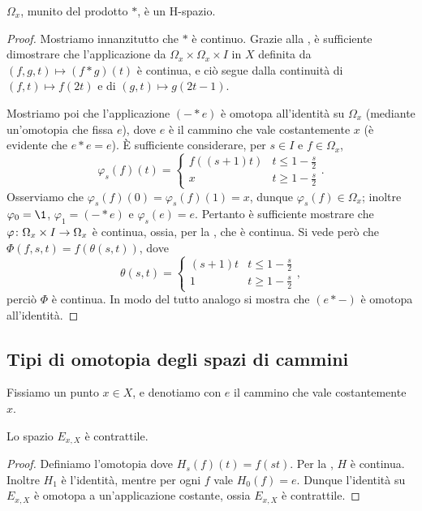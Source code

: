 \begin{proposition}
\(\Omega_x\), munito del prodotto \(\ast\), è un H-spazio.
\end{proposition}
\begin{proof}
Mostriamo innanzitutto che \(\ast\) è continuo. Grazie alla , è sufficiente dimostrare che l'applicazione da \(\Omega_x\times\Omega_x\times I\) in \(X\) definita da \((f,g,t)\mapsto (f\ast g)(t)\) è continua, e ciò segue dalla continuità di \((f,t)\mapsto f(2t)\) e di \((g,t)\mapsto g(2t-1)\).

Mostriamo poi che l'applicazione \((-\ast e)\)
è omotopa all'identità su \(\Omega_x\) (mediante un'omotopia che fissa \(e\)), dove \(e\) è il cammino che vale costantemente \(x\) (è evidente che \(e\ast e=e\)). È sufficiente considerare, per \(s\in I\) e \(f\in\Omega_x\), 
\[
\varphi_s(f)(t)=
\begin{cases}
f((s+1)t)&t\le 1-\frac{s}{2}\\
x&t\ge 1-\frac{s}{2}
\end{cases}.
\]
Osserviamo che \(\varphi_s(f)(0)=\varphi_s(f)(1)=x\), dunque \(\varphi_s(f)\in\Omega_x\); inoltre \(\varphi_0=\1\), \(\varphi_1=(-\ast e)\) e \(\varphi_s(e)=e\). Pertanto è sufficiente mostrare che \(\map{\varphi}{\Omega_x\times I}{\Omega_x}\) è continua, ossia, per la , che
è continua. Si vede però che \(\Phi(f,s,t)=f(\theta(s,t))\), dove
\[
\theta(s,t)=
\begin{cases}
(s+1)t&t\le 1-\frac{s}{2}\\
1&t\ge 1-\frac{s}{2}
\end{cases},
\]
perciò \(\Phi\) è continua. In modo del tutto analogo si mostra che \((e\ast-)\) è omotopa all'identità.
\end{proof}

\subsection{Tipi di omotopia degli spazi di cammini}

Fissiamo un punto \(x\in X\), e denotiamo con \(e\) il cammino che vale costantemente \(x\).

\begin{proposition}
Lo spazio \(E_{x,X}\) è contrattile.
\end{proposition}
\begin{proof}
Definiamo l'omotopia
dove \(H_s(f)(t)=f(st)\). Per la , \(H\) è continua. Inoltre \(H_1\) è l'identità, mentre per ogni \(f\) vale \(H_0(f)=e\). Dunque l'identità su \(E_{x,X}\) è omotopa a un'applicazione costante, ossia \(E_{x,X}\) è contrattile.
\end{proof}

